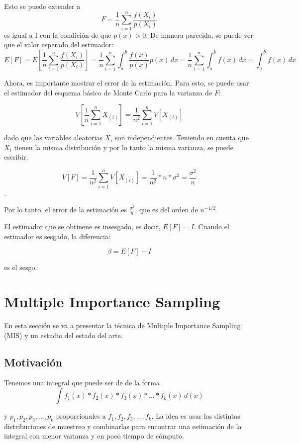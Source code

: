 \documentclass{article}
\begin{document}
Esto se puede extender a
$$ F = \frac{1}{n} \sum_{i=1}^{n} \frac{f(X_i)}{p(X_i)}$$
es igual a I con la condición de que $p(x) > 0$. De manera parecida, se puede ver que el valor esperado del estimador:
$$E[F] = E\left[\frac{1}{n} \sum_{i=1}^{n} \frac{f(X_i)}{p(X_i)}\right] = \frac{1}{n} \sum_{i=1}^{n} \int_{a}^{b} \frac{f(x)}{p(x)} p(x) \,dx = \frac{1}{n} \sum_{i=1}^{n} \int_{a}^{b} f(x) \,dx = \int_{a}^{b} f(x) \,dx$$

Ahora, es importante mostrar el error de la estimación. Para esto, se puede usar el estimador del esquema básico de Monte Carlo para la varianza de $F$:

$$V[\frac{1}{n}\sum_{i=1}^{n} X_{(i)}] = \frac{1}{n^{2}} \sum_{i=1}^{n} V[X_{(i)}]$$

dado que las variables aleatorias $X_{i}$ son independientes. Teniendo en cuenta que $X_{i}$ tienen la misma distribución y por lo tanto la misma varianza, se puede escribir:

$$V[F] = \frac{1}{n^{2}} \sum_{i=1}^{n} V[X_{(i)}] = \frac{1}{n^{2}} * n * \sigma^{2} = \frac{\sigma^{2}}{n}$$.

Por lo tanto, el error de la estimación es $\frac{\sigma^{2}}{n}$, que es del orden de $n^{-1/2}$.

El estimador que se obtinene es insesgado, es decir, $E[F] = I$. Cuando el estimador es sesgado, la diferencia:

$$\beta = E[F] - I$$

es el sesgo.

\section{Multiple Importance Sampling}

En esta sección se va a presentar la técnica de Multiple Importance Sampling (MIS) y un estudio del estado del arte.

\subsection{Motivación}

Tenemos una integral que puede ser de de la forma
$$ \int f_{1}(x) * f_{2}(x) * f_{3}(x) * ... * f_{k}(x) \,d(x)$$

y $ p_{1}, p_{2}, p_{3}, ..., p_{k}$ proporcionales a $f_{1}, f_{2}, f_{3}, ..., f_{k}$.
La idea es usar las distintas distribuciones de muestreo y combinarlas para encontrar una estimación de la integral con menor varianza y en poco tiempo de cómputo.
\end{document}
